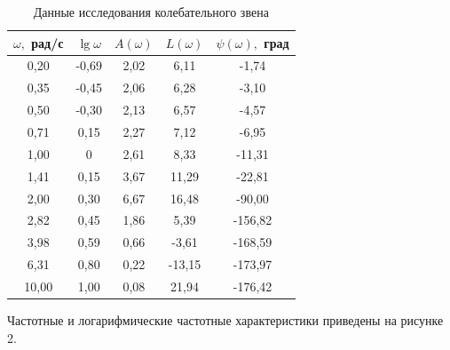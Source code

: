 \documentclass[a4paper, 11pt, russian]{article}
\begin{document}
    \begin{table}[ht!]
        \flushleft
        \caption{Данные исследования колебательного звена}
        \begin{tabular}{|c|c|c|c|c|}
        	\hline
            $\omega,$ рад/с & $\lg{\omega}$ & $A(\omega)$ & $L(\omega)$ & $\psi(\omega),$ град\\
            \hline
            0,20 & -0,69 & 2,02 & 6,11 & -1,74\\
            \hline
            0,35 & -0,45 & 2,06 & 6,28 & -3,10\\
            \hline
            0,50 & -0,30 & 2,13 & 6,57 & -4,57\\
            \hline
            0,71 & 0,15 & 2,27 & 7,12 & -6,95\\
            \hline
            1,00 & 0 & 2,61 & 8,33 & -11,31\\
            \hline
            1,41 & 0,15 & 3,67 & 11,29 & -22,81\\
            \hline
            2,00 & 0,30 & 6,67 & 16,48 & -90,00\\ %
            \hline
            2,82 & 0,45 & 1,86 & 5,39 & -156,82\\
            \hline
            3,98 & 0,59 & 0,66 & -3,61 & -168,59\\
            \hline
            6,31 & 0,80 & 0,22 & -13,15 & -173,97\\
            \hline
            10,00 & 1,00 & 0,08 & 21,94 & -176,42\\
            \hline
        \end{tabular}
    \end{table}
    \newpage
    Частотные и логарифмические частотные характеристики приведены на рисунке 2.
\end{document}
